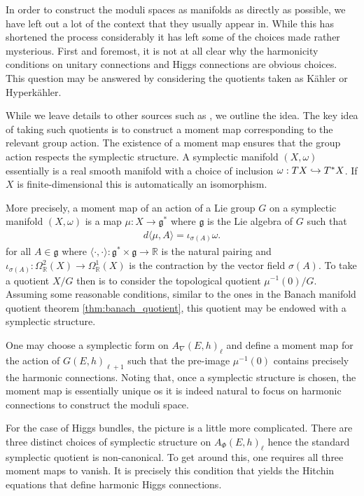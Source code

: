 \documentclass[12pt]{ociamthesis}  %
\begin{document}
In order to construct the moduli spaces as manifolds as directly as
possible, we have left out a lot of the context that they usually appear
in. While this has shortened the process considerably it has left
some of the choices made rather mysterious. First and foremost, it is
not at all clear why the harmonicity conditions on unitary connections and
Higgs connections are obvious choices. This question may be
answered by considering the quotients taken as K\"ahler or Hyperk\"ahler.

While we leave details to other sources such as \missingcitation,
we outline the idea. The key idea of taking such quotients is to
construct a moment map corresponding to the relevant group action.
The existence of a moment map ensures that the group action respects
the symplectic structure. A symplectic manifold $(X,\omega)$
essentially is a real smooth manifold with a choice of inclusion
$\omega : TX \hookrightarrow T^*X$. If $X$ is finite-dimensional this is
automatically an isomorphism.

More precisely, a moment map of an action of a Lie group $G$ on a symplectic manifold
$(X,\omega)$ is a map $\mu : X \to \mathfrak g^*$
where $\mathfrak g$ is the Lie algebra of $G$ such that
\begin{align*}
  d\langle\mu,A\rangle = \iota_{\sigma(A)}\omega.
\end{align*}
for all $A\in\mathfrak g$ where $\langle \cdot,\cdot\rangle : \mathfrak g^* \times \mathfrak g \to \mathbb R$
is the natural pairing and $\iota_{\sigma(A)} : \Omega^2_{\mathbb R}(X)\to \Omega^1_{\mathbb R}(X)$
is the contraction by the vector field $\sigma(A)$. To take a
quotient $X/G$ then is to consider the topological quotient $\mu^{-1}(0)/G$.
Assuming some reasonable conditions, similar to the ones
in the Banach manifold quotient theorem \ref{thm:banach_quotient},
this quotient may be endowed with a symplectic structure.

One may choose a symplectic form on $A_\nabla(E,h)_\ell$ and
define a moment map for the action of $G(E,h)_{\ell+1}$ such that the
pre-image $\mu^{-1}(0)$ contains precisely the harmonic connections.
Noting that, once a symplectic structure is chosen, the moment map
is essentially unique os it is indeed natural to focus on harmonic
connections to construct the moduli space.

For the case of Higgs bundles, the picture is a little more complicated.
There are three distinct choices of symplectic structure on
$A_\Phi(E,h)_\ell$ hence the standard symplectic quotient is non-canonical.
To get around this, one requires all three moment maps to vanish. It is
precisely this condition that yields the Hitchin equations that
define harmonic Higgs connections.
\end{document}
